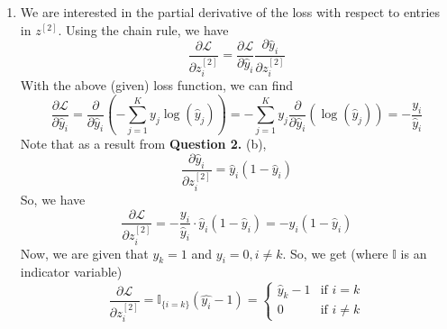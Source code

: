 \documentclass[10pt]{article}
\begin{document}
\begin{enumerate}[label=(\alph*)]
        \item We are interested in the partial derivative of the loss with respect to entries in $z^{[2]}$. Using
        the chain rule, we have
        \begin{equation*}
            \frac{\partial{\mathcal{L}}}{\partial{z^{[2]}_{i}}} =
            \frac{\partial{\mathcal{L}}}{\partial{\hat{y}_{i}}} \frac{\partial{\hat{y}_{i}}}{\partial{z^{[2]}_{i}}}
        \end{equation*}
        With the above (given) loss function, we can find
        \begin{equation*}
            \frac{\partial{\mathcal{L}}}{\partial{\hat{y}_{i}}}
            = \frac{\partial}{\partial{\hat{y}_{i}}} \left( -\sum_{j=1}^{K} y_{j} \log{(\hat{y}_{j})} \right)
            = -\sum_{j=1}^{K} y_{j} \frac{\partial}{\partial{\hat{y}_{i}}} (\log{(\hat{y}_{j})})
            = - \frac{y_{i}}{\hat{y}_{i}}
        \end{equation*}
        Note that as a result from \textbf{Question 2.} (b),
        \begin{equation*}
            \frac{\partial{\hat{y}_{i}}}{\partial{z^{[2]}_{i}}} = \hat{y}_{i} (1 - \hat{y}_{i})
        \end{equation*}
        So, we have
        \begin{equation*}
            \frac{\partial{\mathcal{L}}}{\partial{z^{[2]}_{i}}} = - \frac{y_{i}}{\hat{y}_{i}} \cdot \hat{y}_{i} (1 - \hat{y}_{i})
            = - y_{i} (1 - \hat{y}_{i})
        \end{equation*}
        Now, we are given that $y_{k} = 1$ and $y_{i} = 0, i \neq k$. So, we get (where $\mathbb{I}$ is an indicator variable)
        \begin{equation*}
            \frac{\partial{\mathcal{L}}}{\partial{z^{[2]}_{i}}} = \mathbb{I}_{\{i = k\}} (\hat{y_{i}} - 1) = \begin{cases}
                \hat{y}_{k} - 1 & \text{if } i = k \\
                0 & \text{if } i \neq k
            \end{cases}
        \end{equation*}


\end{enumerate}
\end{document}
